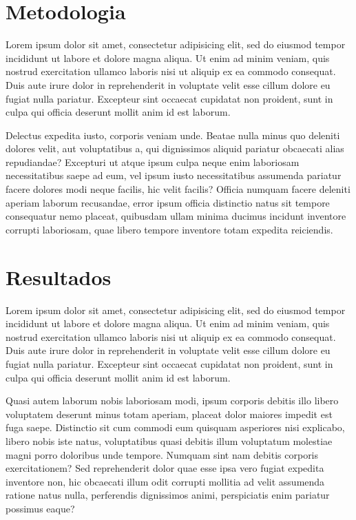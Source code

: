 \documentclass[
    12pt,               %
    openright,          %
    twoside,            %
    a4paper,            %
    chapter=TITLE,     %
    english,            %
    spanish,            %
    portuguese              %
    ]{abntex2}
\begin{document}
\chapter{Metodologia}

Lorem ipsum dolor sit amet, consectetur adipisicing elit, sed do eiusmod tempor incididunt ut labore et dolore magna aliqua. Ut enim ad minim veniam, quis nostrud exercitation ullamco laboris nisi ut aliquip ex ea commodo consequat. Duis aute irure dolor in reprehenderit in voluptate velit esse cillum dolore eu fugiat nulla pariatur. Excepteur sint occaecat cupidatat non proident, sunt in culpa qui officia deserunt mollit anim id est laborum.


Delectus expedita iusto, corporis veniam unde. Beatae nulla minus quo deleniti dolores velit, aut voluptatibus a, qui dignissimos aliquid pariatur obcaecati alias repudiandae? Excepturi ut atque ipsum culpa neque enim laboriosam necessitatibus saepe ad eum, vel ipsum iusto necessitatibus assumenda pariatur facere dolores modi neque facilis, hic velit facilis? Officia numquam facere deleniti aperiam laborum recusandae, error ipsum officia distinctio natus sit tempore consequatur nemo placeat, quibusdam ullam minima ducimus incidunt inventore corrupti laboriosam, quae libero tempore inventore totam expedita reiciendis.



\chapter{Resultados}

Lorem ipsum dolor sit amet, consectetur adipisicing elit, sed do eiusmod tempor incididunt ut labore et dolore magna aliqua. Ut enim ad minim veniam, quis nostrud exercitation ullamco laboris nisi ut aliquip ex ea commodo consequat. Duis aute irure dolor in reprehenderit in voluptate velit esse cillum dolore eu fugiat nulla pariatur. Excepteur sint occaecat cupidatat non proident, sunt in culpa qui officia deserunt mollit anim id est laborum.


Quasi autem laborum nobis laboriosam modi, ipsum corporis debitis illo libero voluptatem deserunt minus totam aperiam, placeat dolor maiores impedit est fuga saepe. Distinctio sit cum commodi eum quisquam asperiores nisi explicabo, libero nobis iste natus, voluptatibus quasi debitis illum voluptatum molestiae magni porro doloribus unde tempore. Numquam sint nam debitis corporis exercitationem? Sed reprehenderit dolor quae esse ipsa vero fugiat expedita inventore non, hic obcaecati illum odit corrupti mollitia ad velit assumenda ratione natus nulla, perferendis dignissimos animi, perspiciatis enim pariatur possimus eaque?
\end{document}
